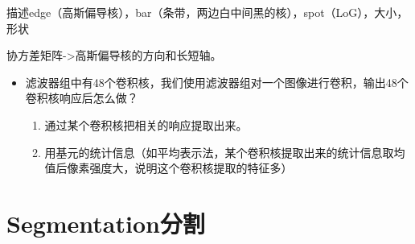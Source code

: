 \documentclass[UTF8]{ctexart}
\begin{document}
描述edge（高斯偏导核），bar（条带，两边白中间黑的核），spot（LoG），大小，形状

协方差矩阵->高斯偏导核的方向和长短轴。

\begin{itemize}
    \item 滤波器组中有48个卷积核，我们使用滤波器组对一个图像进行卷积，输出48个卷积核响应后怎么做？
    \begin{enumerate}
        \item 通过某个卷积核把相关的响应提取出来。
        \item 用基元的统计信息（如平均表示法，某个卷积核提取出来的统计信息取均值后像素强度大，说明这个卷积核提取的特征多）
    \end{enumerate}
\end{itemize}

\section{Segmentation分割}
\end{document}
